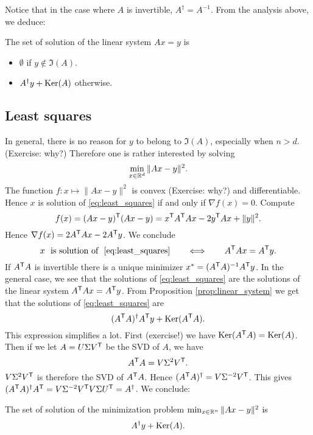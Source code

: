\documentclass[11pt,nocut]{article}
\begin{document}
Notice that in the case where $A$ is invertible, $A^{\dagger} = A^{-1}$.
From the analysis above, we deduce:
\begin{proposition}\label{prop:linear_system}
	The set of solution of the linear system $Ax = y$ is
	\begin{itemize}
		\item $\emptyset$ if $y \not\in \Im(A)$.
		\item $A^{\dagger}y + {{\rm Ker}}(A)$ otherwise.
	\end{itemize}
\end{proposition}

\subsection{Least squares}

In general, there is no reason for $y$ to belong to $\Im(A)$, especially when $n > d$. (Exercise: why?)
Therefore one is rather interested by solving
\begin{equation}\label{eq:least_squares}
\min_{x \in \mathbb{R}^d} \| Ax - y \|^2.
\end{equation}
The function $f: x \mapsto \|Ax - y\|^2$ is convex (Exercise: why?) and differentiable. Hence
$x$ is solution of \eqref{eq:least_squares} if and only if $\nabla f (x) = 0$. Compute
$$
f(x) = (Ax - y)^{{\sf T}}(Ax - y) = x^{{\sf T}} A^{{\sf T}} A x - 2 y^{{\sf T}} A x + \|y\|^2.
$$
Hence $\nabla f(x) = 2 A^{{\sf T}} A x - 2 A^{{\sf T}} y$. We conclude
$$
x \ \ \text{is solution of} \ \ \eqref{eq:least_squares} \qquad
\Longleftrightarrow
\qquad A^{\sT} A x = A^{\sT} y.
$$
If $A^{{\sf T}} A$ is invertible there is a unique minimizer $x^* = (A^{{\sf T}} A)^{-1} A^{{\sf T}} y$.
In the general case, we see that the solutions of \eqref{eq:least_squares} are the solutions of the linear system $A^{{\sf T}} A x = A^{{\sf T}} y$. From Proposition \ref{prop:linear_system} we get that the solutions of \eqref{eq:least_squares} are
$$
(A^{{\sf T}}A)^{\dagger} A^{{\sf T}}y + {{\rm Ker}}(A^{{\sf T}} A).
$$
This expression simplifies a lot. First (exercise!) we have ${{\rm Ker}}(A^{{\sf T}} A) = {{\rm Ker}}(A)$.
Then if we let $A = U \Sigma V^{{\sf T}}$ be the SVD of $A$, we have
$$
A^{{\sf T}} A = V \Sigma^2 V^{{\sf T}}.
$$
$V \Sigma^2 V^{{\sf T}}$ is therefore the SVD of $A^{{\sf T}} A$. Hence $(A^{{\sf T}} A)^{\dagger} = V \Sigma^{-2} V^{{\sf T}}$.
This gives $(A^{{\sf T}}A)^{\dagger} A^{{\sf T}} = V \Sigma^{-2} V^{{\sf T}}V \Sigma U^{{\sf T}} = A^{\dagger}$. We conclude:

\begin{proposition}\label{prop:least_squares}
	The set of solution of the minimization problem $\min_{x \in \mathbb{R}^n} \|Ax - y\|^2$ is
	$$
	A^{\dagger} y + {{\rm Ker}}(A).
	$$
\end{proposition}
\end{document}
